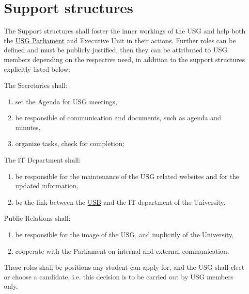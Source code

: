 \section{Support structures} 
\label{suppstrucdef}
The Support structures shall foster the inner workings of the USG and help both the \hyperref[USGParliamentDef]{USG Parliament} and Executive Unit in their actions. Further roles can be defined and must be publicly justified, then they can be attributed to USG members depending on the respective need, in addition to the support structures explicitly listed below:
\begin{parenum}
\item The Secretaries shall:
\begin{enumerate}
\item set the Agenda for USG meetings,
\item be responsible of communication and documents, such as agenda and minutes,
\item organize tasks, check for completion;
\end{enumerate}

\item The IT Department shall:
\begin{enumerate}
\item be responsible for the maintenance of the USG related websites and for the updated information,
\item be the link between the \hyperref[studentbody]{USB} and the IT department of the University.
\end{enumerate}

\item Public Relations  shall:
\begin{enumerate}
    \item be responsible for the image of the USG, and implicitly of the University, 
    \item cooperate with the Parliament on internal and external communication.
\end{enumerate}

\end{parenum}
These roles shall be positions any student can apply for, and the USG shall elect or choose a candidate, i.e. this decision is to be carried out by USG members only.